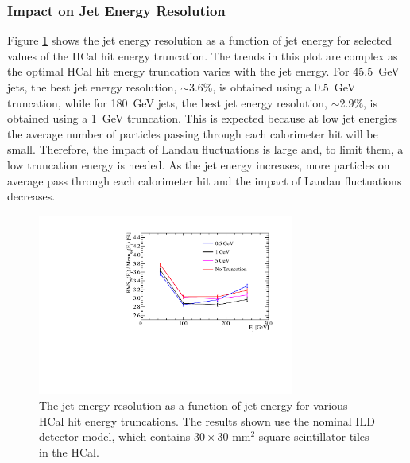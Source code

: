 
\subsubsection{Impact on Jet Energy Resolution}
Figure \ref{fig:jercelltrunc} shows the jet energy resolution as a function of jet energy for selected values of the HCal hit energy truncation.  The trends in this plot are complex as the optimal HCal hit energy truncation varies with the jet energy.  For 45.5~GeV jets, the best jet energy resolution, $\sim$3.6\%, is obtained using a 0.5~GeV truncation, while for 180~GeV jets, the best jet energy resolution, $\sim$2.9\%, is obtained using a 1~GeV truncation.  This is expected because at low jet energies the average number of particles passing through each calorimeter hit will be small.  Therefore, the impact of Landau fluctuations is large and, to limit them, a low truncation energy is needed.  As the jet energy increases, more particles on average pass through each calorimeter hit and the impact of Landau fluctuations decreases.  

\begin{figure}[h!]
\includegraphics[width=0.75\textwidth]{EnergyEstimators/Plots/CellTruncation/JER_vs_JetEnergy_HCalCellTruncation.pdf}
\caption[The jet energy resolution as a function of jet energy for various HCal hit energy truncations.  The results shown use the nominal ILD detector model, which contains $30\times30 \text{ mm}^{2}$ square scintillator tiles in the HCal.]{The jet energy resolution as a function of jet energy for various HCal hit energy truncations.  The results shown use the nominal ILD detector model, which contains $30\times30 \text{ mm}^{2}$ square scintillator tiles in the HCal.}
\label{fig:jercelltrunc}
\end{figure}

